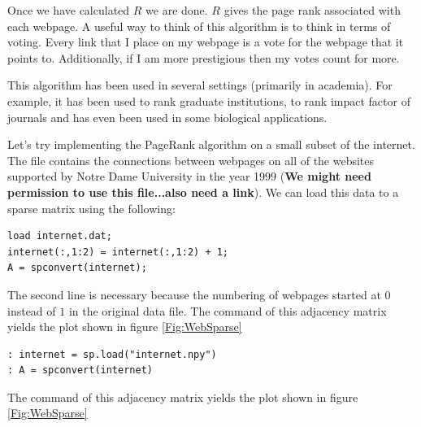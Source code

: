 Once we have calculated $R$ we are done. $R$ gives the page rank associated with each webpage. A useful way to think of this algorithm is to think in terms of voting. Every link that I place on my webpage is a vote for the webpage that it points to. Additionally, if I am more prestigious then my votes count for more.

This algorithm has been used in several settings (primarily in academia). For example, it has been used to rank graduate institutions, to rank impact factor of journals and has even been used in some biological applications.

Let's try implementing the PageRank algorithm on a small subset of the internet. The file  contains the connections between webpages on all of the websites supported by Notre Dame University in the year 1999 ({\bf We might need permission to use this file...also need a link}). We can load this data to a sparse matrix using the following:

\begin{matlab}
\begin{lstlisting}[style=matlab]
load internet.dat;
internet(:,1:2) = internet(:,1:2) + 1;
A = spconvert(internet);
\end{lstlisting}

The second line is necessary because the numbering of webpages started at $0$ instead of $1$ in the original data file. The  command of this adjacency matrix yields the plot shown in figure \ref{Fig:WebSparse}
\end{matlab}

\begin{python}
\begin{lstlisting}[style=python]
: internet = sp.load("internet.npy")
: A = spconvert(internet)
\end{lstlisting}
The  command of this adjacency matrix yields the plot shown in figure \ref{Fig:WebSparse}
\end{python}



